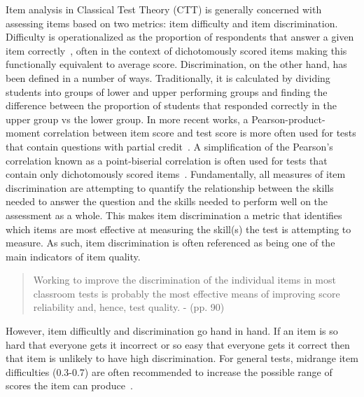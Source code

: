 \documentclass[authorversion,nonacm]{acmart}
\begin{document}
Item analysis in Classical Test Theory (CTT) is generally concerned with
assessing items based on two metrics: item difficulty and item discrimination.
Difficulty is operationalized as the proportion of respondents that answer a
given item correctly~\cite{engelhart1965comparison, brennan1972generalized},
often in the context of dichotomously scored items making this functionally
equivalent to average score.  Discrimination, on the other hand, has been
defined in a number of ways.  Traditionally, it is calculated by dividing
students into groups of lower and upper performing groups and finding the difference
between
the proportion of students that responded correctly in the upper group vs the
lower group. In more recent works, a Pearson-product-moment correlation between
item score and test score is more often used for tests that contain questions
with partial credit~\cite{setiawan2014simulation}. A simplification of the
Pearson's correlation known as a point-biserial correlation is often used for
tests that contain only dichotomously scored items~\cite{kornbrot2014point}.
Fundamentally, all measures of item discrimination are attempting to quantify
the relationship between the skills needed to answer the question and the skills
needed to perform well on the assessment as a whole. This makes item discrimination a
metric that identifies which items are most effective at measuring the skill(s)
the test is attempting to measure.  As such, item discrimination is often
referenced as being one of the main indicators of item quality. 
\begin{quote}
    Working to improve the discrimination of the individual items in most
    classroom tests is probably the most effective means of improving score
    reliability and, hence, test quality. - \citet{ebel1972essentials} (pp. 90)
\end{quote}
However, item difficultly and discrimination go hand in hand. If an item is
so hard that everyone gets it incorrect or so easy that everyone gets it correct then that item is unlikely to have high discrimination. For general tests, midrange item difficulties (0.3-0.7)
are often recommended to increase the possible range of scores the item can
produce~\cite{lord1953application, ebel1972essentials, hotiu2006relationship}.


\end{document}
